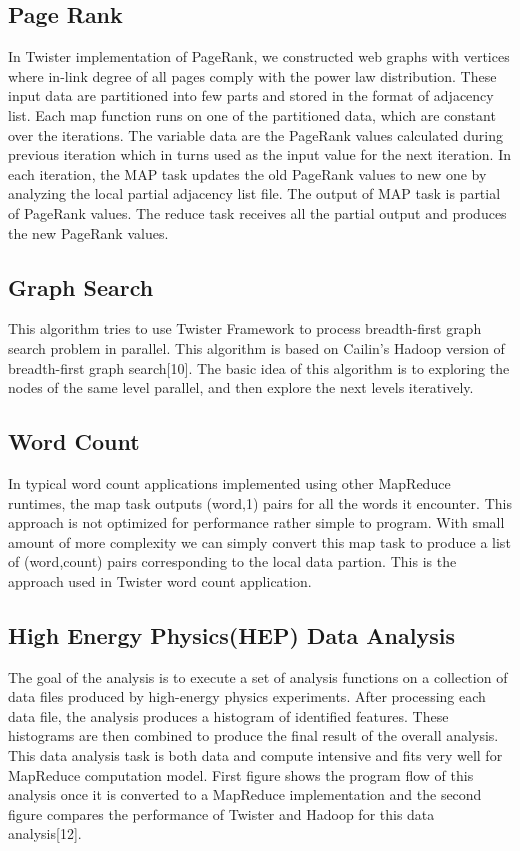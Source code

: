 \documentclass[9pt,twocolumn,twoside]{../../styles/osajnl}
\begin{document}
\subsection{Page Rank}

In Twister implementation of PageRank, we constructed web graphs with
vertices where in-link degree of all pages comply with the power law
distribution. These input data are partitioned into few parts and
stored in the format of adjacency list. Each map function runs on one
of the partitioned data, which are constant over the iterations. The
variable data are the PageRank values calculated during previous
iteration which in turns used as the input value for the next
iteration. In each iteration, the MAP task updates the old PageRank
values to new one by analyzing the local partial adjacency list
file. The output of MAP task is partial of PageRank values. The reduce
task receives all the partial output and produces the new PageRank
values\cite{twister}.


\subsection{Graph Search}
This algorithm tries to use Twister Framework to process breadth-first
graph search problem in parallel. This algorithm is based on Cailin's
Hadoop version of breadth-first graph search[10]. The basic idea of
this algorithm is to exploring the nodes of the same level parallel,
and then explore the next levels iteratively\cite{twister}.


\subsection{Word Count}

In typical word count applications implemented using other MapReduce
runtimes, the map task outputs (word,1) pairs for all the words it
encounter. This approach is not optimized for performance rather
simple to program. With small amount of more complexity we can simply
convert this map task to produce a list of (word,count) pairs
corresponding to the local data partion. This is the approach used in
Twister word count application\cite{twister}.


\subsection{High Energy Physics(HEP) Data Analysis}

The goal of the analysis is to execute a set of analysis functions on
a collection of data files produced by high-energy physics
experiments. After processing each data file, the analysis produces a
histogram of identified features. These histograms are then combined
to produce the final result of the overall analysis. This data
analysis task is both data and compute intensive and fits very well
for MapReduce computation model. First figure shows the program flow
of this analysis once it is converted to a MapReduce implementation
and the second figure compares the performance of Twister and Hadoop
for this data analysis[12]\cite{twister}.
\end{document}
